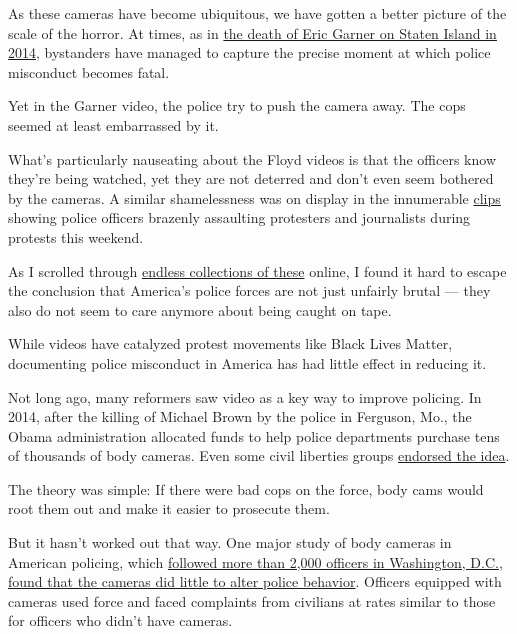 As these cameras have become ubiquitous, we have gotten a better picture
of the scale of the horror. At times, as in
\href{https://www.theguardian.com/us-news/video/2014/dec/04/i-cant-breathe-eric-garner-chokehold-death-video}{the
death of Eric Garner on Staten Island in 2014}, bystanders have managed
to capture the precise moment at which police misconduct becomes fatal.

Yet in the Garner video, the police try to push the camera away. The
cops seemed at least embarrassed by it.

What's particularly nauseating about the Floyd videos is that the
officers know they're being watched, yet they are not deterred and don't
even seem bothered by the cameras. A similar shamelessness was on
display in the innumerable
\href{https://www.theverge.com/2020/5/31/21276044/police-violence-protest-george-floyd}{clips}
showing police officers brazenly assaulting protesters and journalists
during protests this weekend.

As I scrolled through
\href{https://twitter.com/fmanjoo/status/1267290935198486529?s=20}{endless
collections of these} online, I found it hard to escape the conclusion
that America's police forces are not just unfairly brutal --- they also
do not seem to care anymore about being caught on tape.

While videos have catalyzed protest movements like Black Lives Matter,
documenting police misconduct in America has had little effect in
reducing it.

Not long ago, many reformers saw video as a key way to improve policing.
In 2014, after the killing of Michael Brown by the police in Ferguson,
Mo., the Obama administration allocated funds to help police departments
purchase tens of thousands of body cameras. Even some civil liberties
groups
\href{https://www.aclu.org/other/police-body-mounted-cameras-right-policies-place-win-all?redirect=technology-and-liberty/police-body-mounted-cameras-right-policies-place-win-all\#control\%22\%3E\%20position\%20paper\%20\%3C/a\%3Esupporting\%20the\%20use\%20of\%20bodycams\%20by\%20police.}{endorsed
the idea}.

The theory was simple: If there were bad cops on the force, body cams
would root them out and make it easier to prosecute them.

But it hasn't worked out that way. One major study of body cameras in
American policing, which
\href{https://www.pnas.org/content/116/21/10329.short?rss=1}{followed
more than 2,000 officers in Washington, D.C.},
\href{https://www.nytimes3xbfgragh.onion/2017/10/20/upshot/a-big-test-of-police-body-cameras-defies-expectations.html}{found
that the cameras did little to alter police behavior}. Officers equipped
with cameras used force and faced complaints from civilians at rates
similar to those for officers who didn't have cameras.

